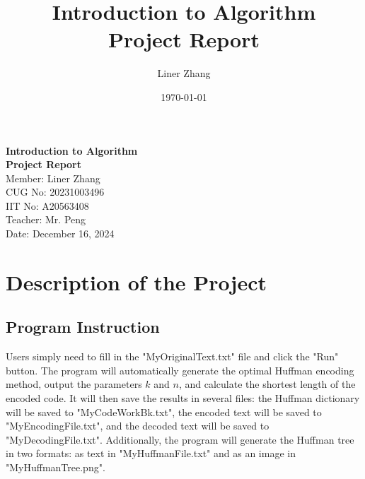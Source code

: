 \documentclass[12pt]{article}
\title{Introduction to Algorithm \\ Project Report}  %
\author{Liner Zhang}   %
\date{\today}          %
\begin{document}
\begin{titlepage}
    \centering
    \vfill
    \Huge \textbf{Introduction to Algorithm} \\[0.5cm]  %
    \Huge \textbf{Project Report} \\[10.0cm]  %
    \Large Member: Liner Zhang \\[0.5cm]
    \Large CUG No: 20231003496  \\[0.5cm]
    \Large IIT No: A20563408 \\[0.5cm]
    \Large Teacher: Mr. Peng \\[0.5cm]
    \Large Date: December 16, 2024 \\[2.0cm]
\end{titlepage}

\tableofcontents  %
\newpage

\section{Description of the Project} 
\subsection{Program Instruction}
Users simply need to fill in the "MyOriginalText.txt" file and click the "Run" button. The program will automatically generate the optimal Huffman encoding method, output the parameters $k$ and $n$, and calculate the shortest length of the encoded code. It will then save the results in several files: the Huffman dictionary will be saved to "MyCodeWorkBk.txt", the encoded text will be saved to "MyEncodingFile.txt", and the decoded text will be saved to "MyDecodingFile.txt". Additionally, the program will generate the Huffman tree in two formats: as text in "MyHuffmanFile.txt" and as an image in "MyHuffmanTree.png".
\end{document}
